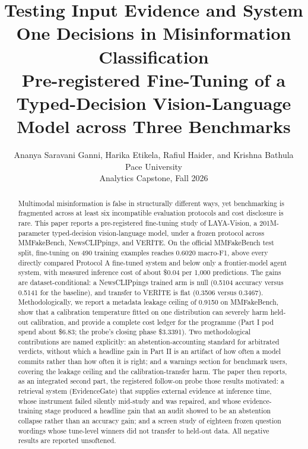 \documentclass{article} %
\title{Testing Input Evidence and System One Decisions in Misinformation Classification\\[2pt] \large Pre-registered Fine-Tuning of a Typed-Decision Vision-Language Model across Three Benchmarks}
\author{Ananya Saravani Ganni, Harika Etikela, Rafiul Haider, and Krishna Bathula\\
Pace University\\
Analytics Capstone, Fall 2026
}
\begin{document}
\maketitle

\begin{abstract}
Multimodal misinformation is false in structurally different ways, yet benchmarking is fragmented across at least six incompatible evaluation protocols and cost disclosure is rare. This paper reports a pre-registered fine-tuning study of LAYA-Vision, a 201M-parameter typed-decision vision-language model, under a frozen protocol across MMFakeBench, NewsCLIPpings, and VERITE. On the official MMFakeBench test split, fine-tuning on 490 training examples reaches 0.6020 macro-F1, above every directly compared Protocol A fine-tuned system and below only a frontier-model agent system, with measured inference cost of about \$0.04 per 1,000 predictions. The gains are dataset-conditional: a NewsCLIPpings trained arm is null (0.5104 accuracy versus 0.5141 for the baseline), and transfer to VERITE is flat (0.3506 versus 0.3467). Methodologically, we report a metadata leakage ceiling of 0.9150 on MMFakeBench, show that a calibration temperature fitted on one distribution can severely harm held-out calibration, and provide a complete cost ledger for the programme (Part I pod spend about \$6.83; the probe's closing phase \$3.3391). Two methodological contributions are named explicitly: an abstention-accounting standard for arbitrated verdicts, without which a headline gain in Part II is an artifact of how often a model commits rather than how often it is right; and a warnings section for benchmark users, covering the leakage ceiling and the calibration-transfer harm. The paper then reports, as an integrated second part, the registered follow-on probe those results motivated: a retrieval system (EvidenceGate) that supplies external evidence at inference time, whose instrument failed silently mid-study and was repaired, and whose evidence-training stage produced a headline gain that an audit showed to be an abstention collapse rather than an accuracy gain; and a screen study of eighteen frozen question wordings whose tune-level winners did not transfer to held-out data. All negative results are reported unsoftened.
\end{abstract}
\end{document}
